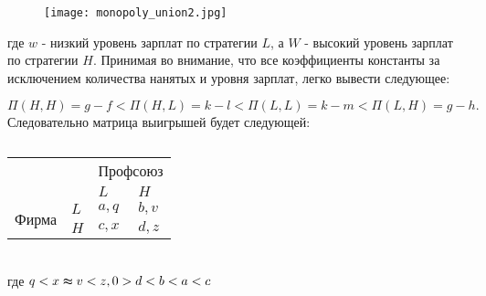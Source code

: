 \begin{figure}[h]
	\texttt{[image: monopoly\_union2.jpg]}
	\caption{}
	\label{fig:monopoly_union1}
\end{figure}
где $w$ - низкий уровень зарплат по стратегии $L$, а $W$ - высокий уровень зарплат по стратегии $H$. 
Принимая во внимание, что все коэффициенты константы за исключением количества нанятых и уровня зарплат, легко вывести следующее:
 
\begin{equation}
\Pi(H,H)=g-f < \Pi(H,L)=k-l < \Pi(L, L)=k-m < \Pi(L,H)=g-h.
\end{equation}
Следовательно матрица выигрышей будет следующей:
\begin{table}[h]
	
	\centering
	\begin{tabular}{|l|l|l|l|}
		\hline
		\multicolumn{2}{|l|}{\multirow{2}{*}{}} & \multicolumn{2}{l|}{Профсоюз} \\ \cline{3-4} 
		\multicolumn{2}{|l|}{}                  & $L$            & $H$            \\ \hline
		\multirow{2}{*}{Фирма}     & $L$     & $a,q$          & $b,v$          \\ \cline{2-4} 
		& $H$     & $c,x$          & $d,z$          \\ \hline
	\end{tabular}
		\caption{}
			\label{table:firm}
				
		
\end{table}\\
где $q < x \thickapprox v < z, 0 > d < b < a < c$
